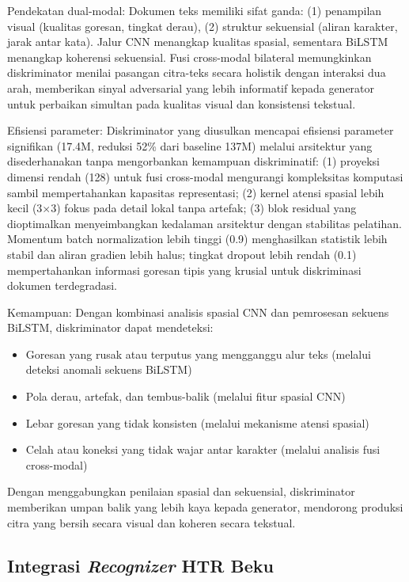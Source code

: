 \documentclass[journal]{IEEEtran}
\begin{document}
Pendekatan dual-modal: Dokumen teks memiliki sifat ganda: (1) penampilan visual (kualitas goresan, tingkat derau), (2) struktur sekuensial (aliran karakter, jarak antar kata). Jalur CNN menangkap kualitas spasial, sementara BiLSTM menangkap koherensi sekuensial. Fusi cross-modal bilateral memungkinkan diskriminator menilai pasangan citra-teks secara holistik dengan interaksi dua arah, memberikan sinyal adversarial yang lebih informatif kepada generator untuk perbaikan simultan pada kualitas visual dan konsistensi tekstual.

Efisiensi parameter: Diskriminator yang diusulkan mencapai efisiensi parameter signifikan (17.4M, reduksi 52\% dari baseline 137M) melalui arsitektur yang disederhanakan tanpa mengorbankan kemampuan diskriminatif: (1) proyeksi dimensi rendah (128) untuk fusi cross-modal mengurangi kompleksitas komputasi sambil mempertahankan kapasitas representasi; (2) kernel atensi spasial lebih kecil (3$\times$3) fokus pada detail lokal tanpa artefak; (3) blok residual yang dioptimalkan menyeimbangkan kedalaman arsitektur dengan stabilitas pelatihan. Momentum batch normalization lebih tinggi (0.9) menghasilkan statistik lebih stabil dan aliran gradien lebih halus; tingkat dropout lebih rendah (0.1) mempertahankan informasi goresan tipis yang krusial untuk diskriminasi dokumen terdegradasi.

Kemampuan: Dengan kombinasi analisis spasial CNN dan pemrosesan sekuens BiLSTM, diskriminator dapat mendeteksi:
\begin{itemize}
    \item Goresan yang rusak atau terputus yang mengganggu alur teks (melalui deteksi anomali sekuens BiLSTM)
    \item Pola derau, artefak, dan tembus-balik (melalui fitur spasial CNN)
    \item Lebar goresan yang tidak konsisten (melalui mekanisme atensi spasial)
    \item Celah atau koneksi yang tidak wajar antar karakter (melalui analisis fusi cross-modal)
\end{itemize}

Dengan menggabungkan penilaian spasial dan sekuensial, diskriminator memberikan umpan balik yang lebih kaya kepada generator, mendorong produksi citra yang bersih secara visual dan koheren secara tekstual.

\subsection{Integrasi \textit{Recognizer} HTR Beku}
\end{document}
